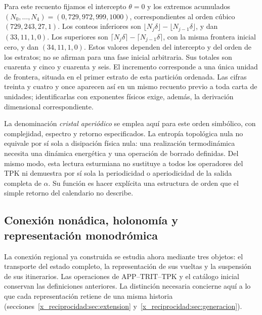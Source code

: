 Para este recuento fijamos el intercepto \(\theta=0\) y los extremos acumulados \((N_0,\ldots,N_4)=(0,729,972,999,1000)\), correspondientes al orden cúbico \((729,243,27,1)\). Los conteos inferiores son \(\lfloor N_j\delta\rfloor-\lfloor N_{j-1}\delta\rfloor\), y dan \((33,11,1,0)\). Los superiores son \(\lceil N_j\delta\rceil-\lceil N_{j-1}\delta\rceil\), con la misma frontera inicial cero, y dan \((34,11,1,0)\). Estos valores dependen del intercepto y del orden de los estratos; no se afirman para una fase inicial arbitraria. Sus totales son cuarenta y cinco y cuarenta y seis. El incremento corresponde a una única unidad de frontera, situada en el primer estrato de esta partición ordenada. Las cifras treinta y cuatro y once aparecen así en un mismo recuento previo a toda carta de unidades; identificarlas con exponentes físicos exige, además, la derivación dimensional correspondiente.

La denominación \emph{cristal aperiódico} se emplea aquí para este orden simbólico, con complejidad, espectro y retorno especificados. La entropía topológica nula no equivale por sí sola a disipación física nula: una realización termodinámica necesita una dinámica energética y una operación de borrado definidas. Del mismo modo, esta lectura esturmiana no sustituye a todos los operadores del TPK ni demuestra por sí sola la periodicidad o aperiodicidad de la salida completa de \(\alpha\). Su función es hacer explícita una estructura de orden que el simple retorno del calendario no describe.


\subsection{Conexión nonádica, holonomía y representación monodrómica}
\label{x_reciprocidad:mono-ampl:conexion}

La conexión regional ya construida se estudia ahora mediante tres objetos:
el transporte del estado completo, la representación de sus vueltas y la
suspensión de sus itinerarios. Las operaciones de APP--TRIT--TPK y el
catálogo inicial conservan las definiciones anteriores. La distinción
necesaria concierne aquí a lo que cada representación retiene de una
misma historia (secciones~\ref{x_reciprocidad:sec:extension} y~\ref{x_reciprocidad:sec:generacion}).

